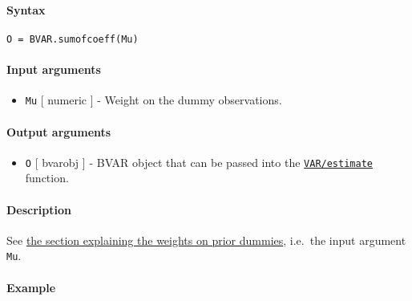 


	\paragraph{Syntax}\label{syntax}

\begin{verbatim}
O = BVAR.sumofcoeff(Mu)
\end{verbatim}

\paragraph{Input arguments}\label{input-arguments}

\begin{itemize}
\itemsep1pt\parskip0pt
\item
  \texttt{Mu} {[} numeric {]} - Weight on the dummy observations.
\end{itemize}

\paragraph{Output arguments}\label{output-arguments}

\begin{itemize}
\itemsep1pt\parskip0pt
\item
  \texttt{O} {[} bvarobj {]} - BVAR object that can be passed into the
  \href{VAR/estimate}{\texttt{VAR/estimate}} function.
\end{itemize}

\paragraph{Description}\label{description}

See \href{BVAR/Contents}{the section explaining the weights on prior
dummies}, i.e.~the input argument \texttt{Mu}.

\paragraph{Example}\label{example}


